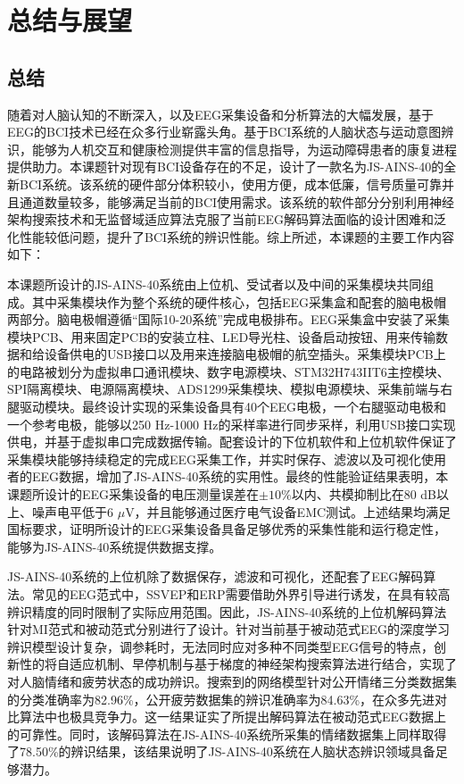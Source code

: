 
\chapter{总结与展望}

\section{总结}

随着对人脑认知的不断深入，以及EEG采集设备和分析算法的大幅发展，基于EEG的BCI技术已经在众多行业崭露头角。基于BCI系统的人脑状态与运动意图辨识，能够为人机交互和健康检测提供丰富的信息指导，为运动障碍患者的康复进程提供助力。本课题针对现有BCI设备存在的不足，设计了一款名为JS-AINS-40的全新BCI系统。该系统的硬件部分体积较小，使用方便，成本低廉，信号质量可靠并且通道数量较多，能够满足当前的BCI使用需求。该系统的软件部分分别利用神经架构搜索技术和无监督域适应算法克服了当前EEG解码算法面临的设计困难和泛化性能较低问题，提升了BCI系统的辨识性能。综上所述，本课题的主要工作内容如下：

本课题所设计的JS-AINS-40系统由上位机、受试者以及中间的采集模块共同组成。其中采集模块作为整个系统的硬件核心，包括EEG采集盒和配套的脑电极帽两部分。脑电极帽遵循“国际10-20系统”完成电极排布。EEG采集盒中安装了采集模块PCB、用来固定PCB的安装立柱、LED导光柱、设备启动按钮、用来传输数据和给设备供电的USB接口以及用来连接脑电极帽的航空插头。采集模块PCB上的电路被划分为虚拟串口通讯模块、数字电源模块、STM32H743IIT6主控模块、SPI隔离模块、电源隔离模块、ADS1299采集模块、模拟电源模块、采集前端与右腿驱动模块。最终设计实现的采集设备具有40个EEG电极，一个右腿驱动电极和一个参考电极，能够以250 Hz-1000 Hz的采样率进行同步采样，利用USB接口实现供电，并基于虚拟串口完成数据传输。配套设计的下位机软件和上位机软件保证了采集模块能够持续稳定的完成EEG采集工作，并实时保存、滤波以及可视化使用者的EEG数据，增加了JS-AINS-40系统的实用性。最终的性能验证结果表明，本课题所设计的EEG采集设备的电压测量误差在$\pm 10\%$以内、共模抑制比在80 dB以上、噪声电平低于6 $\mu$V，并且能够通过医疗电气设备EMC测试。上述结果均满足国标要求，证明所设计的EEG采集设备具备足够优秀的采集性能和运行稳定性，能够为JS-AINS-40系统提供数据支撑。

JS-AINS-40系统的上位机除了数据保存，滤波和可视化，还配套了EEG解码算法。常见的EEG范式中，SSVEP和ERP需要借助外界引导进行诱发，在具有较高辨识精度的同时限制了实际应用范围。因此，JS-AINS-40系统的上位机解码算法针对MI范式和被动范式分别进行了设计。针对当前基于被动范式EEG的深度学习辨识模型设计复杂，调参耗时，无法同时应对多种不同类型EEG信号的特点，创新性的将自适应机制、早停机制与基于梯度的神经架构搜索算法进行结合，实现了对人脑情绪和疲劳状态的成功辨识。搜索到的网络模型针对公开情绪三分类数据集的分类准确率为82.96\%，公开疲劳数据集的辨识准确率为84.63\%，在众多先进对比算法中也极具竞争力。这一结果证实了所提出解码算法在被动范式EEG数据上的可靠性。同时，该解码算法在JS-AINS-40系统所采集的情绪数据集上同样取得了78.50\%的辨识结果，该结果说明了JS-AINS-40系统在人脑状态辨识领域具备足够潜力。

